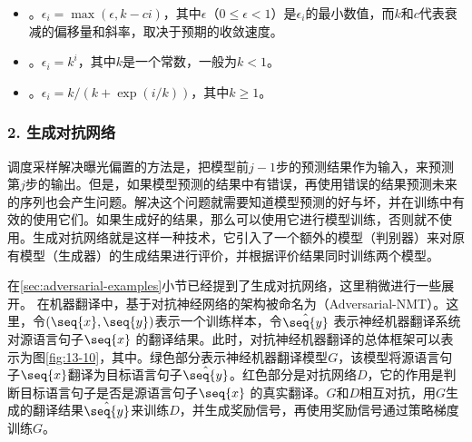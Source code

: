 \begin{itemize}
\vspace{0.5em}
\item {\small{}}。$\epsilon_i = \max⁡(\epsilon,k-ci)$，其中$\epsilon$（$0 \leqslant \epsilon < 1$）是$\epsilon_i$的最小数值，而$k$和$c$代表衰减的偏移量和斜率，取决于预期的收敛速度。
\vspace{0.5em}
\item {\small{}}。$\epsilon_i = k^i$，其中$k$是一个常数，一般为$k < 1$。
\vspace{0.5em}
\item {\small{}}。$\epsilon_i = k/(k + \exp⁡(i/k))$，其中$k \geqslant 1$。
\vspace{0.5em}
\end{itemize}


\subsubsection{2. 生成对抗网络}

\parinterval 调度采样解决曝光偏置的方法是，把模型前$j-1$步的预测结果作为输入，来预测第$j$步的输出。但是，如果模型预测的结果中有错误，再使用错误的结果预测未来的序列也会产生问题。解决这个问题就需要知道模型预测的好与坏，并在训练中有效的使用它们。如果生成好的结果，那么可以使用它进行模型训练，否则就不使用。生成对抗网络就是这样一种技术，它引入了一个额外的模型（判别器）来对原有模型（生成器）的生成结果进行评价，并根据评价结果同时训练两个模型。

\parinterval 在\ref{sec:adversarial-examples}小节已经提到了生成对抗网络，这里稍微进行一些展开。 在机器翻译中，基于对抗神经网络的架构被命名为{\small{}}（Adversarial-NMT）。这里，令$(\seq{x},\seq{y})$表示一个训练样本，令$\hat{\seq{y}}$ 表示神经机器翻译系统对源语言句子$\seq{x}$ 的翻译结果。此时，对抗神经机器翻译的总体框架可以表示为图\ref{fig:13-10}，其中。绿色部分表示神经机器翻译模型$G$，该模型将源语言句子$\seq{x}$翻译为目标语言句子$\hat{\seq{y}}$。红色部分是对抗网络$D$，它的作用是判断目标语言句子是否是源语言句子$\seq{x}$ 的真实翻译。$G$和$D$相互对抗，用$G$生成的翻译结果$\hat{\seq{y}}$来训练$D$，并生成奖励信号，再使用奖励信号通过策略梯度训练$G$。


